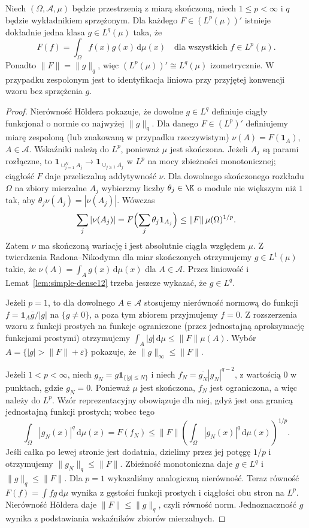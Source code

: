 \begin{twierdzenie}
\label{thm:lp-dual12}
Niech $(\Omega,\mathcal A,\mu)$ będzie przestrzenią z miarą
skończoną, niech $1\le p<\infty$ i $q$ będzie wykładnikiem
sprzężonym. Dla każdego $F\in(L^p(\mu))'$ istnieje dokładnie
jedna klasa $g\in L^q(\mu)$ taka, że
\[
 F(f)=\int_\Omega f(x)g(x)\,\mathrm d\mu(x)
 \quad\text{dla wszystkich }f\in L^p(\mu).
\]
Ponadto $\|F\|=\|g\|_q$, więc
$(L^p(\mu))'\cong L^q(\mu)$ izometrycznie. W przypadku
zespolonym jest to identyfikacja liniowa przy przyjętej konwencji
wzoru bez sprzężenia $g$.
\end{twierdzenie}
\begin{proof}
Nierówność H\"oldera pokazuje, że dowolne $g\in L^q$
definiuje ciągły funkcjonał o normie co najwyżej $\|g\|_q$.
Dla danego $F\in(L^p)'$ definiujemy miarę zespoloną
(lub znakowaną w przypadku rzeczywistym)
$\nu(A)=F(\mathbf1_A)$, $A\in\mathcal A$.
Wskaźniki należą do $L^p$, ponieważ $\mu$ jest skończona.
Jeżeli $A_j$ są parami rozłączne, to
$\mathbf1_{\cup_{j=1}^NA_j}\to\mathbf1_{\cup_{j\ge1}A_j}$
w $L^p$ na mocy zbieżności monotonicznej; ciągłość $F$
daje przeliczalną addytywność $\nu$.
Dla dowolnego skończonego rozkładu $\Omega$ na zbiory
mierzalne $A_j$ wybierzmy liczby $\theta_j\in\K$ o module
nie większym niż $1$ tak, aby
$\theta_j\nu(A_j)=|\nu(A_j)|$. Wówczas
\[
 \sum_j|\nu(A_j)|
 =F\Bigl(\sum_j\theta_j\mathbf1_{A_j}\Bigr)
 \le\|F\|\,\mu(\Omega)^{1/p}.
\]
Zatem $\nu$ ma skończoną wariację i jest absolutnie ciągła
względem $\mu$. Z twierdzenia Radona--Nikodyma dla miar
skończonych otrzymujemy $g\in L^1(\mu)$ takie, że
$\nu(A)=\int_Ag(x)\,\mathrm d\mu(x)$ dla $A\in\mathcal A$.
Przez liniowość i Lemat~\ref{lem:simple-dense12} trzeba jeszcze
wykazać, że $g\in L^q$.

Jeżeli $p=1$, to dla dowolnego $A\in\mathcal A$ stosujemy
nierówność normową do funkcji
$f=\mathbf1_A\overline g/|g|$ na $\{g\ne0\}$,
a poza tym zbiorem przyjmujemy $f=0$. Z rozszerzenia wzoru
z funkcji prostych na funkcje ograniczone (przez jednostajną
aproksymację funkcjami prostymi) otrzymujemy
$\int_A|g|\,\mathrm d\mu\le\|F\|\mu(A)$.
Wybór $A=\{|g|>\|F\|+\varepsilon\}$ pokazuje,
że $\|g\|_\infty\le\|F\|$.

Jeżeli $1<p<\infty$, niech
$g_N=g\mathbf1_{\{|g|\le N\}}$ i niech
$f_N=\overline{g_N}|g_N|^{q-2}$, z wartością $0$ w
punktach, gdzie $g_N=0$. Ponieważ $\mu$ jest skończona,
$f_N$ jest ograniczona, a więc należy do $L^p$.
Wzór reprezentacyjny obowiązuje dla niej, gdyż
jest ona granicą jednostajną funkcji prostych; wobec tego
\[
 \int_\Omega|g_N(x)|^q\,\mathrm d\mu(x)
 =F(f_N)\le\|F\|\left(\int_\Omega|g_N(x)|^q\,\mathrm d\mu(x)\right)^{1/p}.
\]
Jeśli całka po lewej stronie jest dodatnia, dzielimy przez
jej potęgę $1/p$ i otrzymujemy $\|g_N\|_q\le\|F\|$.
Zbieżność monotoniczna daje $g\in L^q$ i $\|g\|_q\le\|F\|$.
Dla $p=1$ wykazaliśmy analogiczną nierówność.
Teraz równość $F(f)=\int fg\,\mathrm d\mu$ wynika z gęstości
funkcji prostych i ciągłości obu stron na $L^p$.
Nierówność H\"oldera daje $\|F\|\le\|g\|_q$, czyli
równość norm. Jednoznaczność $g$ wynika z podstawiania
wskaźników zbiorów mierzalnych.
\end{proof}

